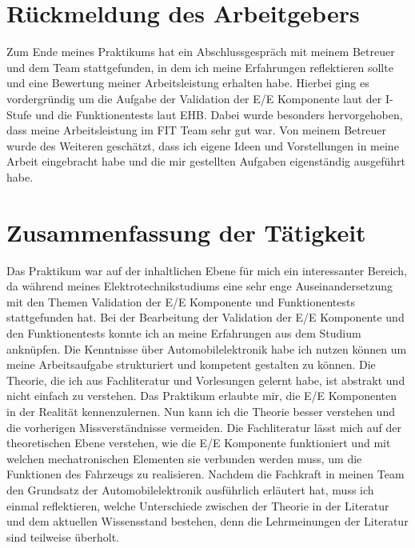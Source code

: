 \documentclass[10pt,a4paper]{report}
\begin{document}
\section{Rückmeldung des Arbeitgebers}
Zum Ende meines Praktikums hat ein Abschlussgespräch mit meinem Betreuer und dem Team stattgefunden, in dem ich meine Erfahrungen reflektieren sollte und eine Bewertung meiner Arbeitsleistung erhalten habe. Hierbei ging es vordergründig um die Aufgabe der Validation der E/E Komponente laut der I-Stufe und die Funktionentests laut EHB. Dabei wurde besonders hervorgehoben, dass meine Arbeitsleistung im FIT Team sehr gut war. Von meinem Betreuer wurde des Weiteren geschätzt, dass ich eigene Ideen und Vorstellungen in meine Arbeit eingebracht habe und die mir gestellten Aufgaben eigenständig ausgeführt habe.

\section{Zusammenfassung der Tätigkeit}
Das Praktikum war auf der inhaltlichen Ebene für mich ein interessanter Bereich, da während meines Elektrotechnikstudiums eine sehr enge Auseinandersetzung mit den Themen Validation der E/E Komponente und Funktionentests stattgefunden hat.
Bei der Bearbeitung der Validation der E/E Komponente und den Funktionentests konnte ich an meine Erfahrungen aus dem Studium anknüpfen. Die Kenntnisse über Automobilelektronik habe ich nutzen können um meine Arbeitsaufgabe strukturiert und kompetent gestalten zu können. Die Theorie, die ich aus Fachliteratur und Vorlesungen gelernt habe, ist abstrakt und nicht einfach zu verstehen. Das Praktikum erlaubte mir, die E/E Komponenten in der Realität kennenzulernen. Nun kann ich die Theorie besser verstehen und die vorherigen Missverständnisse vermeiden. Die Fachliteratur lässt mich auf der theoretischen Ebene verstehen, wie die E/E Komponente funktioniert und mit welchen mechatronischen Elementen sie verbunden werden muss, um die Funktionen des Fahrzeugs zu realisieren. Nachdem die Fachkraft in meinen Team den Grundsatz der Automobilelektronik ausführlich erläutert hat, muss ich einmal reflektieren, welche Unterschiede zwischen der Theorie in der Literatur und dem aktuellen Wissensstand bestehen, denn die Lehrmeinungen der Literatur sind teilweise überholt.

\printbibliography
	                      	
\end{document}
